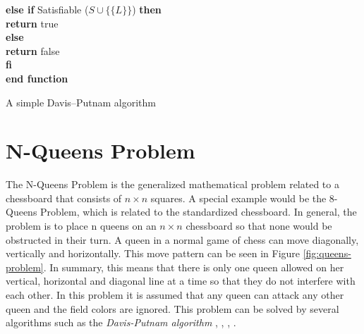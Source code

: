 \begin{listing}[h!]
    \hspace*{0.5cm} \textbf{else if} Satisfiable ($S \cup \{\{L\}\}$) \textbf{then}\\
      \hspace*{1.0cm} \textbf{return} true\\
    \hspace*{0.5cm} \textbf{else}\\
      \hspace*{1.0cm} \textbf{return} false\\
    \hspace*{0.5cm} \textbf{fi}\\
  \textbf{end function}
  \caption{A simple Davis–Putnam algorithm \cite{Zhang2000}}
  \label{code:recursiveDavisPutnam}
\end{listing}

\section{N-Queens Problem}
\label{sec:sciQueens}
The N-Queens Problem is the generalized mathematical problem related to a chessboard that consists of $n \times n$ squares. A special example would be the 8-Queens Problem, which is related to the standardized chessboard. In general, the problem is to place n queens on an $n \times n$ chessboard so that none would be obstructed in their turn. A queen in a normal game of chess can move diagonally, vertically and horizontally. This move pattern can be seen in Figure \ref{fig:queens-problem}. In summary, this means that there is only one queen allowed on her vertical, horizontal and diagonal line at a time so that they do not interfere with each other. In this problem it is assumed that any queen can attack any other queen and the field colors are ignored. This problem can be solved by several algorithms such as the \textit{Davis-Putnam algorithm} \cite{Bell2009}, \cite{Watkins2012}, \cite[146\psq]{Nudelman1995}, \cite{Stroetman2019}.

